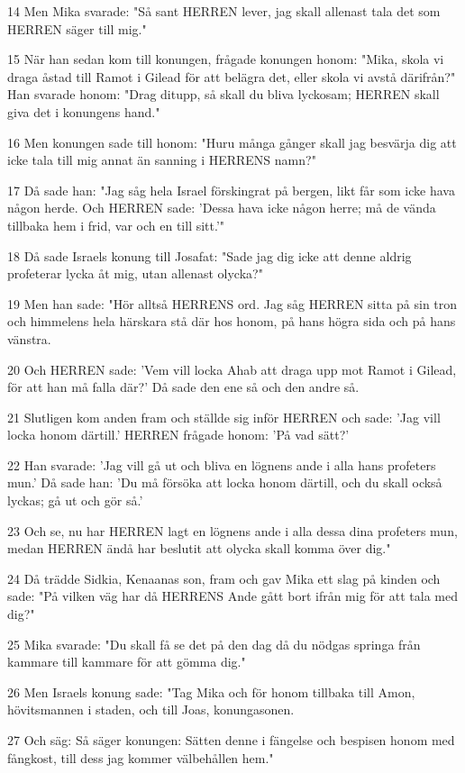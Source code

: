 \par 14 Men Mika svarade: "Så sant HERREN lever, jag skall allenast tala det som HERREN säger till mig."
\par 15 När han sedan kom till konungen, frågade konungen honom: "Mika, skola vi draga åstad till Ramot i Gilead för att belägra det, eller skola vi avstå därifrån?" Han svarade honom: "Drag ditupp, så skall du bliva lyckosam; HERREN skall giva det i konungens hand."
\par 16 Men konungen sade till honom: "Huru många gånger skall jag besvärja dig att icke tala till mig annat än sanning i HERRENS namn?"
\par 17 Då sade han: "Jag såg hela Israel förskingrat på bergen, likt får som icke hava någon herde. Och HERREN sade: 'Dessa hava icke någon herre; må de vända tillbaka hem i frid, var och en till sitt.'"
\par 18 Då sade Israels konung till Josafat: "Sade jag dig icke att denne aldrig profeterar lycka åt mig, utan allenast olycka?"
\par 19 Men han sade: "Hör alltså HERRENS ord. Jag såg HERREN sitta på sin tron och himmelens hela härskara stå där hos honom, på hans högra sida och på hans vänstra.
\par 20 Och HERREN sade: 'Vem vill locka Ahab att draga upp mot Ramot i Gilead, för att han må falla där?' Då sade den ene så och den andre så.
\par 21 Slutligen kom anden fram och ställde sig inför HERREN och sade: 'Jag vill locka honom därtill.' HERREN frågade honom: 'På vad sätt?'
\par 22 Han svarade: 'Jag vill gå ut och bliva en lögnens ande i alla hans profeters mun.' Då sade han: 'Du må försöka att locka honom därtill, och du skall också lyckas; gå ut och gör så.'
\par 23 Och se, nu har HERREN lagt en lögnens ande i alla dessa dina profeters mun, medan HERREN ändå har beslutit att olycka skall komma över dig."
\par 24 Då trädde Sidkia, Kenaanas son, fram och gav Mika ett slag på kinden och sade: "På vilken väg har då HERRENS Ande gått bort ifrån mig för att tala med dig?"
\par 25 Mika svarade: "Du skall få se det på den dag då du nödgas springa från kammare till kammare för att gömma dig."
\par 26 Men Israels konung sade: "Tag Mika och för honom tillbaka till Amon, hövitsmannen i staden, och till Joas, konungasonen.
\par 27 Och säg: Så säger konungen: Sätten denne i fängelse och bespisen honom med fångkost, till dess jag kommer välbehållen hem."
